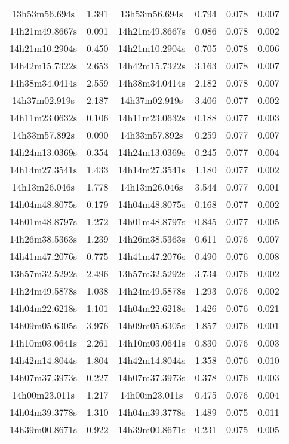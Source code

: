 \begin{table}
\begin{tabular}{cccccc}
13h53m56.694s & 1.391 & 13h53m56.694s & 0.794 & 0.078 & 0.007 \\
14h21m49.8667s & 0.091 & 14h21m49.8667s & 0.086 & 0.078 & 0.002 \\
14h21m10.2904s & 0.450 & 14h21m10.2904s & 0.705 & 0.078 & 0.006 \\
14h42m15.7322s & 2.653 & 14h42m15.7322s & 3.163 & 0.078 & 0.007 \\
14h38m34.0414s & 2.559 & 14h38m34.0414s & 2.182 & 0.078 & 0.007 \\
14h37m02.919s & 2.187 & 14h37m02.919s & 3.406 & 0.077 & 0.002 \\
14h11m23.0632s & 0.106 & 14h11m23.0632s & 0.188 & 0.077 & 0.003 \\
14h33m57.892s & 0.090 & 14h33m57.892s & 0.259 & 0.077 & 0.007 \\
14h24m13.0369s & 0.354 & 14h24m13.0369s & 0.245 & 0.077 & 0.004 \\
14h14m27.3541s & 1.433 & 14h14m27.3541s & 1.180 & 0.077 & 0.002 \\
14h13m26.046s & 1.778 & 14h13m26.046s & 3.544 & 0.077 & 0.001 \\
14h04m48.8075s & 0.179 & 14h04m48.8075s & 0.168 & 0.077 & 0.002 \\
14h01m48.8797s & 1.272 & 14h01m48.8797s & 0.845 & 0.077 & 0.005 \\
14h26m38.5363s & 1.239 & 14h26m38.5363s & 0.611 & 0.076 & 0.007 \\
14h41m47.2076s & 0.775 & 14h41m47.2076s & 0.490 & 0.076 & 0.008 \\
13h57m32.5292s & 2.496 & 13h57m32.5292s & 3.734 & 0.076 & 0.002 \\
14h24m49.5878s & 1.038 & 14h24m49.5878s & 1.293 & 0.076 & 0.002 \\
14h04m22.6218s & 1.101 & 14h04m22.6218s & 1.426 & 0.076 & 0.021 \\
14h09m05.6305s & 3.976 & 14h09m05.6305s & 1.857 & 0.076 & 0.001 \\
14h10m03.0641s & 2.261 & 14h10m03.0641s & 0.830 & 0.076 & 0.003 \\
14h42m14.8044s & 1.804 & 14h42m14.8044s & 1.358 & 0.076 & 0.010 \\
14h07m37.3973s & 0.227 & 14h07m37.3973s & 0.378 & 0.076 & 0.003 \\
14h00m23.011s & 1.217 & 14h00m23.011s & 0.475 & 0.076 & 0.004 \\
14h04m39.3778s & 1.310 & 14h04m39.3778s & 1.489 & 0.075 & 0.011 \\
14h39m00.8671s & 0.922 & 14h39m00.8671s & 0.231 & 0.075 & 0.005 \\

\end{tabular}
\end{table}

